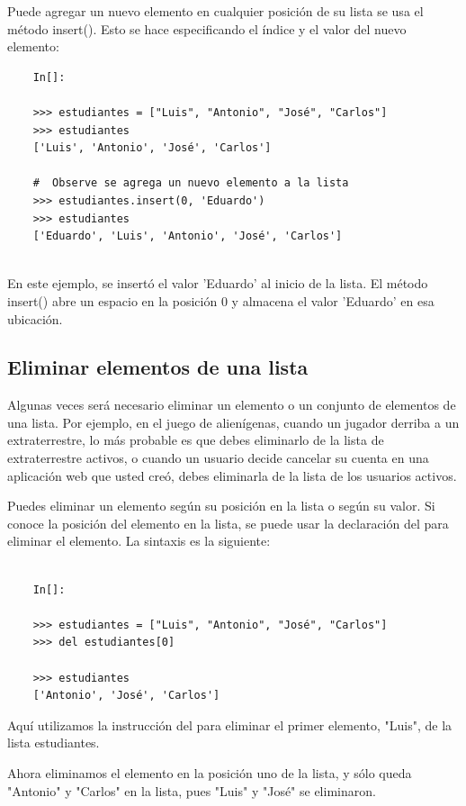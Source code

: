 Puede agregar un nuevo elemento en cualquier posición de su lista se usa el método {\ttfamily insert()}. 
Esto se hace especificando el índice y el valor del nuevo elemento:

\begin{lstlisting}
	In[]:
	
	>>> estudiantes = ["Luis", "Antonio", "José", "Carlos"]
	>>> estudiantes
	['Luis', 'Antonio', 'José', 'Carlos']
	
	#  Observe se agrega un nuevo elemento a la lista
	>>> estudiantes.insert(0, 'Eduardo')
	>>> estudiantes
	['Eduardo', 'Luis', 'Antonio', 'José', 'Carlos']
	
\end{lstlisting} En este ejemplo, se insertó  el valor 'Eduardo' al inicio de la
lista. El  método {\ttfamily insert()} abre un espacio en la posición 0 y almacena el valor
'Eduardo' en esa ubicación.


\subsection{Eliminar elementos de una lista}

Algunas veces  será necesario eliminar un elemento o un conjunto de elementos de una lista. Por ejemplo, en el juego de alienígenas, 
cuando un jugador derriba a un extraterrestre, lo más probable es que debes eliminarlo de la lista de extraterrestre activos, o cuando un usuario decide cancelar su cuenta en una aplicación web que usted creó,  debes  eliminarla de la lista  de los usuarios  activos.

Puedes eliminar un elemento según su posición en la lista o según su valor. Si conoce la posición del elemento en la lista, se puede usar la  declaración {\ttfamily del}  para eliminar el elemento. La sintaxis es la siguiente:

\begin{lstlisting}
	
	In[]:
	
	>>> estudiantes = ["Luis", "Antonio", "José", "Carlos"]
	>>> del estudiantes[0]
	
	>>> estudiantes
	['Antonio', 'José', 'Carlos']
\end{lstlisting} Aquí utilizamos la instrucción {\ttfamily del} para eliminar el primer elemento, "Luis", de la
lista  estudiantes. 

Ahora eliminamos el elemento en la posición  uno de la lista, y sólo queda {}"{}Antonio"{}  y {}
"{}Carlos"{} en la lista,  pues "{}Luis"{} y {}"{}José"{} se eliminaron.


